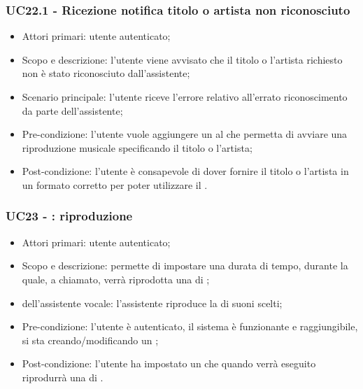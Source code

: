 \subsubsection{UC22.1 - Ricezione notifica titolo o artista non riconosciuto}
\begin{itemize}
	\item  Attori primari: utente autenticato;
	\item  Scopo e descrizione: l'utente viene avvisato che il titolo o l'artista richiesto non è stato riconosciuto dall'assistente;
	\item  Scenario principale: l'utente riceve l'errore relativo all'errato riconoscimento da parte dell'assistente;
	\item  Pre-condizione: l'utente vuole aggiungere un  al  che permetta di avviare una riproduzione musicale specificando il titolo o l'artista;
	\item  Post-condizione: l'utente è consapevole di dover fornire il titolo o l'artista in un formato corretto per poter utilizzare il .
\end{itemize}
\subsubsection{UC23 - : riproduzione }
\begin{itemize}
	\item  Attori primari: utente autenticato;
	\item  Scopo e descrizione: permette di impostare una durata di tempo, durante la quale, a  chiamato, verrà riprodotta una  di ;%
	\item  {} dell'assistente vocale: l'assistente riproduce la  di suoni scelti;
	\item  Pre-condizione: l'utente è autenticato, il sistema è funzionante e raggiungibile, si sta creando/modificando un ;
	\item  Post-condizione: l'utente ha impostato un  che quando verrà eseguito riprodurrà una  di .
\end{itemize}
